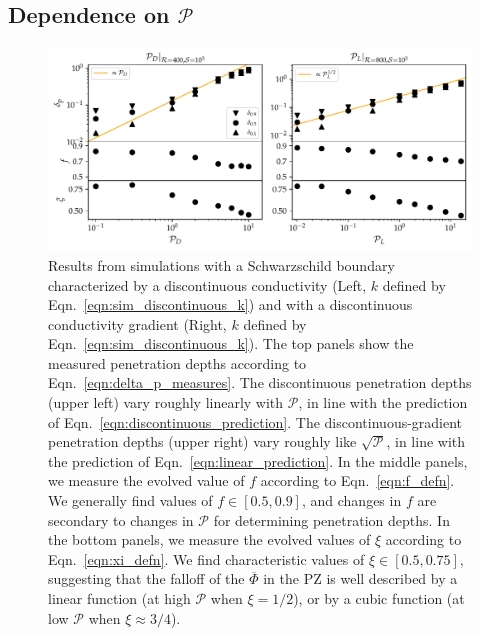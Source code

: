 \documentclass[twocolumn]{aastex631}
\newcommand{\mP}{\ensuremath{\mathcal{P}}}
\renewcommand{\bar}[1]{\overline{#1}}
\begin{document}
\subsection{Dependence on $\mP$}
\begin{figure}[t]
\centering
\includegraphics[width=\textwidth]{parameters_vs_p.pdf}
\caption{
Results from simulations with a Schwarzschild boundary characterized by a discontinuous conductivity (Left, $k$ defined by Eqn.~\ref{eqn:sim_discontinuous_k}) and with a discontinuous conductivity gradient (Right, $k$ defined by Eqn.~\ref{eqn:sim_discontinuous_k}).
The top panels show the measured penetration depths according to Eqn.~\ref{eqn:delta_p_measures}.
The discontinuous penetration depths (upper left) vary roughly linearly with $\mP$, in line with the prediction of Eqn.~\ref{eqn:discontinuous_prediction}.
The discontinuous-gradient penetration depths (upper right) vary roughly like $\sqrt{\mP}$, in line with the prediction of Eqn.~\ref{eqn:linear_prediction}.
In the middle panels, we measure the evolved value of $f$ according to Eqn.~\ref{eqn:f_defn}.
We generally find values of $f \in [0.5, 0.9]$, and changes in $f$ are secondary to changes in $\mP$ for determining penetration depths.
In the bottom panels, we measure the evolved values of $\xi$ according to Eqn.~\ref{eqn:xi_defn}.
We find characteristic values of $\xi \in [0.5, 0.75]$, suggesting that the falloff of the $\bar{\Phi}$ in the PZ is well described by a linear function (at high $\mP$ when $\xi = 1/2$), or by a cubic function (at low $\mP$ when $\xi \approx 3/4$).
\label{fig:parameters_vs_p}
}
\end{figure}
\end{document}
